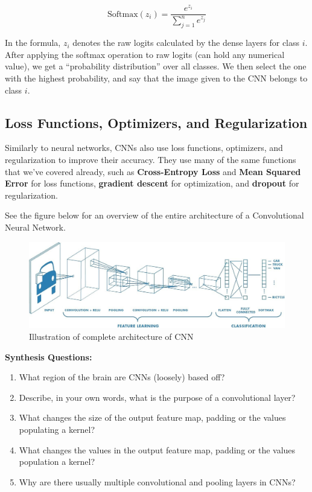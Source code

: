 \begin{flushleft}
        $$\mathrm{Softmax}(z_i) = \frac{e^{z_i}}{\sum^{n}_{j=1} e^{z_j}}$$
        
        In the formula, $z_i$ denotes the raw logits calculated by the dense layers for class $i$. After applying the softmax operation to raw logits (can hold any numerical value), we get a ``probability distribution'' over all classes. We then select the one with the highest probability, and say that the image given to the CNN belongs to class $i$.

        \subsection{Loss Functions, Optimizers, and Regularization}
        Similarly to neural networks, CNNs also use loss functions, optimizers, and regularization to improve their accuracy. They use many of the same functions that we've covered already, such as \textbf{Cross-Entropy Loss} and \textbf{Mean Squared Error} for loss functions, \textbf{gradient descent} for optimization, and \textbf{dropout} for regularization. \break

        See the figure below for an overview of the entire architecture of a Convolutional Neural Network.  \break
        
        \begin{figure}[H]
            \centering
            \includegraphics[width=1\linewidth]{cv/full_cnn.png}
            \caption{Illustration of complete architecture of CNN}
            \label{fig:full_cnn}
        \end{figure}
\end{flushleft}

\vspace{10bp}
\begin{questionbox}
    \textbf{Synthesis Questions:}
    \begin{enumerate}    
        \item What region of the brain are CNNs (loosely) based off?
        \item Describe, in your own words, what is the purpose of a convolutional layer?
        \item What changes the size of the output feature map, padding or the values populating a kernel?
        \item What changes the values in the output feature map, padding or the values population a kernel?
        \item Why are there usually multiple convolutional and pooling layers in CNNs?
    \end{enumerate}
    \vspace{1bp}
\end{questionbox}

